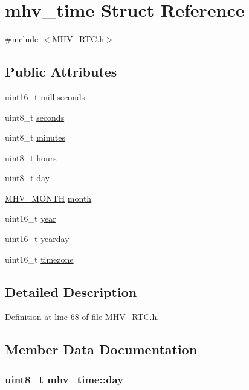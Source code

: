 \hypertarget{structmhv__time}{
\section{mhv\-\_\-time \-Struct \-Reference}
\label{structmhv__time}
}


{\ttfamily \#include $<$\-M\-H\-V\-\_\-\-R\-T\-C.\-h$>$}

\subsection*{\-Public \-Attributes}
\begin{DoxyCompactItemize}
\item 
uint16\-\_\-t \hyperlink{structmhv__time_a88f1e6b1d010c2f21b11bd335b1fae65}{milliseconds}
\item 
uint8\-\_\-t \hyperlink{structmhv__time_a4844293af0a3648391fb9335f2aa758c}{seconds}
\item 
uint8\-\_\-t \hyperlink{structmhv__time_a72c1e9925d2d3de254c6550c0b309347}{minutes}
\item 
uint8\-\_\-t \hyperlink{structmhv__time_a86216ab6b58bede2c74b8b38745c81f7}{hours}
\item 
uint8\-\_\-t \hyperlink{structmhv__time_aa20dafe05aae315fff313d53656c6318}{day}
\item 
\hyperlink{_m_h_v___r_t_c_8h_a98c5fb7fa4cf35056e932e294af7cbb5}{\-M\-H\-V\-\_\-\-M\-O\-N\-T\-H} \hyperlink{structmhv__time_a832c57e459789022fb39b7c704a3e926}{month}
\item 
uint16\-\_\-t \hyperlink{structmhv__time_ab5441551ca64fde709afdc98fa5c851e}{year}
\item 
uint16\-\_\-t \hyperlink{structmhv__time_aa5e9d8969550c007c40f6b2dd404d3d6}{yearday}
\item 
uint16\-\_\-t \hyperlink{structmhv__time_abe9ad1b2bfd43e6688c07367a279c50b}{timezone}
\end{DoxyCompactItemize}


\subsection{\-Detailed \-Description}


\-Definition at line 68 of file \-M\-H\-V\-\_\-\-R\-T\-C.\-h.



\subsection{\-Member \-Data \-Documentation}
\hypertarget{structmhv__time_aa20dafe05aae315fff313d53656c6318}{
\subsubsection[{day}]{\setlength{\rightskip}{0pt plus 5cm}uint8\-\_\-t {\bf mhv\-\_\-time\-::day}}}
\label{structmhv__time_aa20dafe05aae315fff313d53656c6318}


